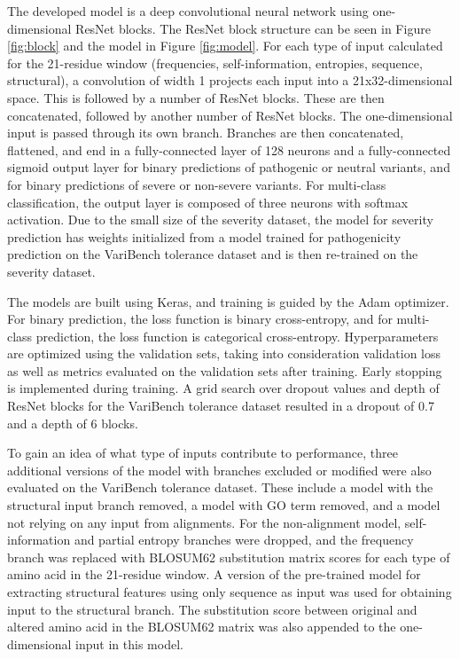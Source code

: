 \documentclass[11pt]{article}
\begin{document}
The developed model is a deep convolutional neural network using one-dimensional ResNet blocks. The ResNet block structure can be seen in Figure \ref{fig:block} and the model in Figure \ref{fig:model}. For each type of input calculated for the 21-residue window (frequencies, self-information, entropies, sequence, structural), a convolution of width 1 projects each input into a 21x32-dimensional space. This is followed by a number of ResNet blocks. These are then concatenated, followed by another number of ResNet blocks. The one-dimensional input is passed through its own branch. Branches are then concatenated, flattened, and end in a fully-connected layer of 128 neurons and a fully-connected sigmoid output layer for binary predictions of pathogenic or neutral variants, and for binary predictions of severe or non-severe variants. For multi-class classification, the output layer is composed of three neurons with softmax activation. Due to the small size of the severity dataset, the model for severity prediction has weights initialized from a model trained for pathogenicity prediction on the VariBench tolerance dataset and is then re-trained on the severity dataset.

The models are built using Keras\cite{chollet2015keras}, and training is guided by the Adam\cite{kingma2014adam} optimizer. For binary prediction, the loss function is binary cross-entropy, and for multi-class prediction, the loss function is categorical cross-entropy. Hyperparameters are optimized using the validation sets, taking into consideration validation loss as well as metrics evaluated on the validation sets after training. Early stopping is implemented during training. A grid search over dropout values and depth of ResNet blocks for the VariBench tolerance dataset resulted in a dropout of 0.7 and a depth of 6 blocks.

To gain an idea of what type of inputs contribute to performance, three additional versions of the model with branches excluded or modified were also evaluated on the VariBench tolerance dataset. These include a model with the structural input branch removed, a model with GO term removed, and a model not relying on any input from alignments. For the non-alignment model, self-information and partial entropy branches were dropped, and the frequency branch was replaced with BLOSUM62 substitution matrix scores for each type of amino acid in the 21-residue window. A version of the pre-trained model for extracting structural features using only sequence as input was used for obtaining input to the structural branch. The substitution score between original and altered amino acid in the BLOSUM62 matrix was also appended to the one-dimensional input in this model.
\end{document}
